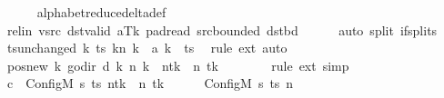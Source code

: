 \begin{isabellebody}
\ \ \ \ \isamarkupfalse%
\ alphabet{\isacharunderscore}{\kern0pt}reduce{\isacharunderscore}{\kern0pt}delta{\isacharunderscore}{\kern0pt}def\isanewline
\ \ \ \ \isamarkupfalse%
\ rel{\isacharunderscore}{\kern0pt}in\ vsrc\ dst{\isacharunderscore}{\kern0pt}valid\ aTk\ pad{\isacharunderscore}{\kern0pt}read\ src{\isacharunderscore}{\kern0pt}bounded\ dst{\isacharunderscore}{\kern0pt}bd\isanewline
\ \ \ \ \isamarkupfalse%
\ {\isacharparenleft}{\kern0pt}auto\ split{\isacharcolon}{\kern0pt}\ if{\isacharunderscore}{\kern0pt}splits{\isacharparenright}{\kern0pt}\isanewline
\ \ \isamarkupfalse%
\ ts{\isacharunderscore}{\kern0pt}unchanged{\isacharcolon}{\kern0pt}\ {\isachardoublequoteopen}{\isacharparenleft}{\kern0pt}{\isasymlambda}k{\isachardot}{\kern0pt}\ {\isacharparenleft}{\kern0pt}ts\ k{\isacharparenright}{\kern0pt}{\isacharparenleft}{\kern0pt}n\ k\ {\isacharcolon}{\kern0pt}{\isacharequal}{\kern0pt}\ {\isacharquery}{\kern0pt}a\ k{\isacharparenright}{\kern0pt}{\isacharparenright}{\kern0pt}\ {\isacharequal}{\kern0pt}\ ts{\isachardoublequoteclose}\ \isamarkupfalse%
\ {\isacharparenleft}{\kern0pt}rule\ ext{\isacharparenright}{\kern0pt}\ auto\isanewline
\ \ \isamarkupfalse%
\ pos{\isacharunderscore}{\kern0pt}new{\isacharcolon}{\kern0pt}\ {\isachardoublequoteopen}{\isacharparenleft}{\kern0pt}{\isasymlambda}k{\isachardot}{\kern0pt}\ go{\isacharunderscore}{\kern0pt}dir\ {\isacharparenleft}{\kern0pt}{\isacharquery}{\kern0pt}d\ k{\isacharparenright}{\kern0pt}\ {\isacharparenleft}{\kern0pt}n\ k{\isacharparenright}{\kern0pt}{\isacharparenright}{\kern0pt}\ {\isacharequal}{\kern0pt}\ n{\isacharparenleft}{\kern0pt}tk\ {\isacharcolon}{\kern0pt}{\isacharequal}{\kern0pt}\ n\ tk\ {\isacharminus}{\kern0pt}\ {}{\isacharparenright}{\kern0pt}{\isachardoublequoteclose}\isanewline
\ \ \ \ \isamarkupfalse%
\ {\isacharparenleft}{\kern0pt}rule\ ext{\isacharparenright}{\kern0pt}\ simp\isanewline
\ \ \isamarkupfalse%
\ {\isacharquery}{\kern0pt}c{\isacharprime}{\kern0pt}{\isacharprime}{\kern0pt}\ {\isacharequal}{\kern0pt}\ {\isachardoublequoteopen}Config\isactrlsub M\ {\isacharquery}{\kern0pt}s{\isacharprime}{\kern0pt}\ ts\ {\isacharparenleft}{\kern0pt}n{\isacharparenleft}{\kern0pt}tk\ {\isacharcolon}{\kern0pt}{\isacharequal}{\kern0pt}\ n\ tk\ {\isacharminus}{\kern0pt}\ {}{\isacharparenright}{\kern0pt}{\isacharparenright}{\kern0pt}{\isachardoublequoteclose}\isanewline
\ \ \isamarkupfalse%
\ {\isachardoublequoteopen}{\isacharparenleft}{\kern0pt}Config\isactrlsub M\ {\isacharquery}{\kern0pt}s\ ts\ n{\isacharcomma}{\kern0pt}\isanewline

\end{isabellebody}
